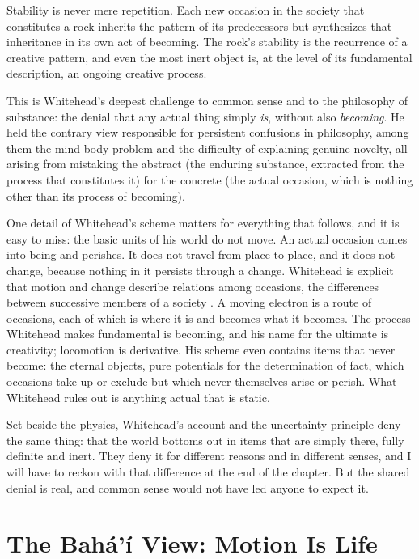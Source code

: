 Stability is never mere repetition. Each new occasion in the society that constitutes a rock inherits the pattern of its predecessors but synthesizes that inheritance in its own act of becoming. The rock's stability is the recurrence of a creative pattern, and even the most inert object is, at the level of its fundamental description, an ongoing creative process.

This is Whitehead's deepest challenge to common sense and to the philosophy of substance: the denial that any actual thing simply \emph{is}, without also \emph{becoming}. He held the contrary view responsible for persistent confusions in philosophy, among them the mind-body problem and the difficulty of explaining genuine novelty, all arising from mistaking the abstract (the enduring substance, extracted from the process that constitutes it) for the concrete (the actual occasion, which is nothing other than its process of becoming).

One detail of Whitehead's scheme matters for everything that follows, and it is easy to miss: the basic units of his world do not move. An actual occasion comes into being and perishes. It does not travel from place to place, and it does not change, because nothing in it persists through a change. Whitehead is explicit that motion and change describe relations among occasions, the differences between successive members of a society \citep{Whitehead1929}. A moving electron is a route of occasions, each of which is where it is and becomes what it becomes. The process Whitehead makes fundamental is becoming, and his name for the ultimate is creativity; locomotion is derivative. His scheme even contains items that never become: the eternal objects, pure potentials for the determination of fact, which occasions take up or exclude but which never themselves arise or perish. What Whitehead rules out is anything actual that is static.

Set beside the physics, Whitehead's account and the uncertainty principle deny the same thing: that the world bottoms out in items that are simply there, fully definite and inert. They deny it for different reasons and in different senses, and I will have to reckon with that difference at the end of the chapter. But the shared denial is real, and common sense would not have led anyone to expect it.


\section{The Bahá'í View: Motion Is Life}
\label{sec:ch12-bahai}

